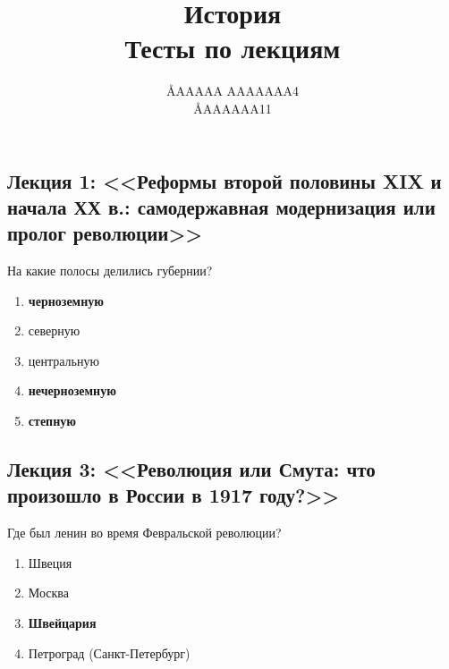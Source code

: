 \documentclass[12pt]{article}
\title{История \\ Тесты по лекциям}
\author{\AA{AAAAA AAAAAAA}{4} \\ \AA{AAAAAA}{11}}
\begin{document}
  \maketitle

  \subsection*{Лекция 1: <<Реформы второй половины XIX и начала ХХ в.: самодержавная модернизация или пролог революции>>}
  На какие полосы делились губернии?
  \begin{enumerate}
    \item \textbf{черноземную}
    \item северную
    \item центральную
    \item \textbf{нечерноземную}
    \item \textbf{степную}
  \end{enumerate}

  \subsection*{Лекция 3: <<Революция или Смута: что произошло в России в 1917 году?>>}
  Где был ленин во время Февральской революции?
  \begin{enumerate}
    \item Швеция
    \item Москва
    \item \textbf{Швейцария}
    \item Петроград (Санкт-Петербург)
  \end{enumerate}
\end{document}
